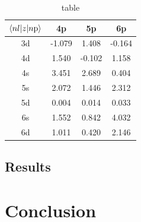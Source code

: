 \begin{table}[]
	\centering
	\begin{tabular}{cccc}
		\toprule
		$\braket{nl|z|n\mathrm{p}}$ &     4p &     5p &     6p \\
		\midrule
		3d & -1.079 &  1.408 & -0.164 \\
		4d &  1.540 & -0.102 &  1.158 \\
		4s &  3.451 &  2.689 &  0.404 \\
		5s &  2.072 &  1.446 &  2.312 \\
		5d &  0.004 &  0.014 &  0.033 \\
		6s &  1.552 &  0.842 &  4.032 \\
		6d &  1.011 &  0.420 &  2.146 \\
		\bottomrule
	\end{tabular}
	\caption{table}
	\label{tab:matrix_elements}
\end{table}


\subsection{Results}
\label{sec:ATS_ar_results}

\section{Conclusion}
\label{sec:ATS_conclusion}

